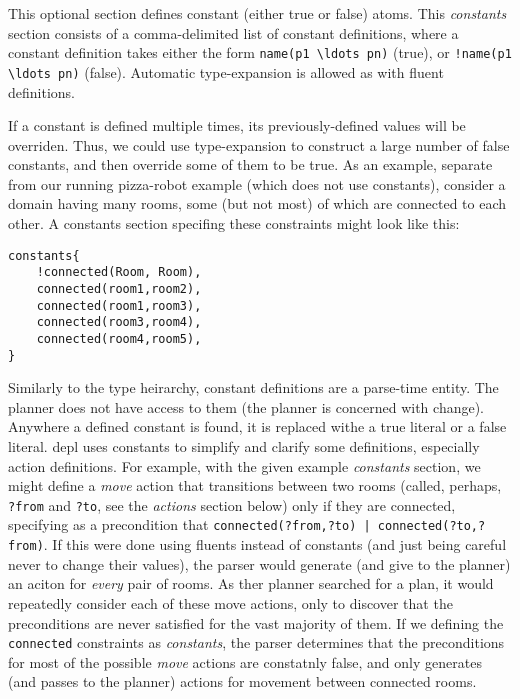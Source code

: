 \documentclass{article}
\begin{document}
This optional section defines constant (either true or false) atoms. This
\emph{constants} section consists of a comma-delimited list of constant
definitions, where a constant definition takes either the form
\verb|name(p1 \ldots pn)| (true), 
or
\verb|!name(p1 \ldots pn)| (false).
Automatic type-expansion is allowed as with fluent definitions.

If a constant is defined multiple times, its previously-defined values will be
overriden. Thus, we could use type-expansion to construct
a large number of false constants, and then
override some of them to be true. As an example, separate from our
running pizza-robot example (which does not use constants), consider a domain
having many rooms, some (but not most) of which are connected to each other.
A constants section specifing these constraints might look like this:

\begin{verbatim}
constants{
    !connected(Room, Room),
    connected(room1,room2),
    connected(room1,room3),
    connected(room3,room4),
    connected(room4,room5),
}
\end{verbatim}

Similarly to the type heirarchy, constant definitions are a parse-time entity.
The planner does not have access to them (the planner is concerned with change).
Anywhere a defined constant is found, it is replaced withe a true literal or a
false literal.  depl uses constants to simplify and clarify some definitions,
especially action definitions. For example, with the given example
\emph{constants} section, we might define a \emph{move} action that transitions
between two rooms (called, perhaps, \verb|?from| and \verb|?to|, see the
\emph{actions} section below) only if they are connected, specifying as a
precondition that \verb"connected(?from,?to) | connected(?to,?from)".  If this
were done using fluents instead of constants (and just being careful never to
change their values), the parser would generate (and give to the planner) an
aciton for \emph{every} pair of rooms. As ther planner searched for a plan, it
would repeatedly consider each of these move actions, only to discover that the
preconditions are never satisfied for the vast majority of them. If we defining
the \verb|connected| constraints as \emph{constants}, the parser determines that
the preconditions for most of the possible \emph{move} actions are constatnly
false, and only generates (and passes to the planner) actions for movement
between connected rooms.
\end{document}
